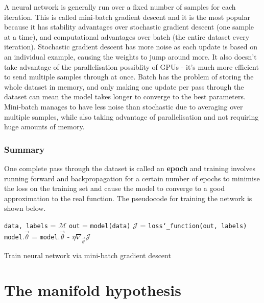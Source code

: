 A neural network is generally run over a fixed number of samples for each iteration. This is called 
mini-batch gradient descent and it is the most popular because it has stability advantages over stochastic gradient descent (one sample at a time),
and computational advantages over batch (the entire dataset every iteration). 
Stochastic gradient descent has more noise as each update is based on an individual example, causing the weights to jump around more. It also doesn't take advantage of the 
parallelisation possiblity of GPUs - it's much more efficient to send multiple samples through at once. Batch has the problem of storing the whole 
dataset in memory, and only making one update per pass through the dataset can mean the model takes longer to converge to the best parameters. Mini-batch manages to
have less noise than stochastic due to averaging over multiple samples, while also taking advantage of parallelisation and not requiring huge amounts of memory.

\subsubsection{Summary}

One complete pass through the dataset 
is called an \textbf{epoch} and 
training involves running forward and backpropagation for a certain number of epochs to minimise the loss
on the training set and cause the model to converge to a good approximation to the real function. The pseudocode for training the network 
is shown below.
\begin{algorithm}
  \begin{algorithmic}[1]
    \State \texttt{data, labels} = $\mathcal{M}$
    \State \texttt{out} = \texttt{model(data)}
    \State $\mathcal{J}$ = \texttt{loss\char`_function(out, labels)}
    \State \texttt{model}.$\vec{\theta}$ = \texttt{model}.$\vec{\theta}$ - $\eta \nabla_{\vec{\theta}} \mathcal{J}$ 
    \EndFor
    \EndFor
    \EndProcedure
  \end{algorithmic}
  \caption{Train neural network via mini-batch gradient descent} 
  \label{alg:train}
\end{algorithm}

\section{The manifold hypothesis}

